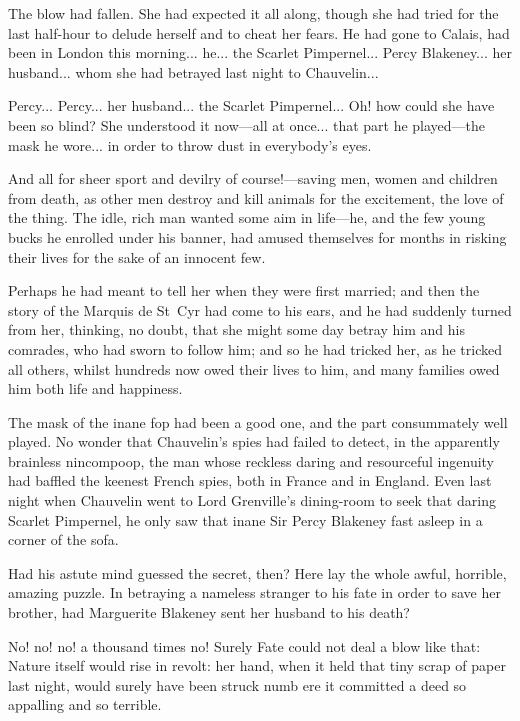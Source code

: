 The blow had fallen. She had expected it all along, though she had tried for the last half-hour to delude herself and to cheat her fears. He had gone to Calais, had been in London this morning... he... the Scarlet Pimpernel... Percy Blakeney... her husband... whom she had betrayed last night to Chauvelin...

Percy... Percy... her husband... the Scarlet Pimpernel... Oh! how could she have been so blind? She understood it now\allowbreak---\allowbreak all at once... that part he played\allowbreak---\allowbreak the mask he wore... in order to throw dust in everybody's eyes.

And all for sheer sport and devilry of course!\allowbreak---\allowbreak saving men, women and children from death, as other men destroy and kill animals for the excitement, the love of the thing. The idle, rich man wanted some aim in life\allowbreak---\allowbreak he, and the few young bucks he enrolled under his banner, had amused themselves for months in risking their lives for the sake of an innocent few.

Perhaps he had meant to tell her when they were first married; and then the story of the Marquis de St~Cyr had come to his ears, and he had suddenly turned from her, thinking, no doubt, that she might some day betray him and his comrades, who had sworn to follow him; and so he had tricked her, as he tricked all others, whilst hundreds now owed their lives to him, and many families owed him both life and happiness.

The mask of the inane fop had been a good one, and the part consummately well played. No wonder that Chauvelin's spies had failed to detect, in the apparently brainless nincompoop, the man whose reckless daring and resourceful ingenuity had baffled the keenest French spies, both in France and in England. Even last night when Chauvelin went to Lord Grenville's dining-room to seek that daring Scarlet Pimpernel, he only saw that inane Sir Percy Blakeney fast asleep in a corner of the sofa.

Had his astute mind guessed the secret, then? Here lay the whole awful, horrible, amazing puzzle. In betraying a nameless stranger to his fate in order to save her brother, had Marguerite Blakeney sent her husband to his death?

No! no! no! a thousand times no! Surely Fate could not deal a blow like that: Nature itself would rise in revolt: her hand, when it held that tiny scrap of paper last night, would surely have been struck numb ere it committed a deed so appalling and so terrible.


